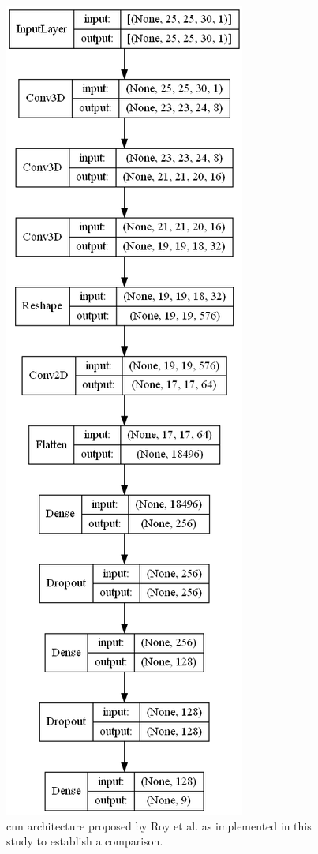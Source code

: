 \begin{figure}[bp]
    \centering
    \includegraphics[width=\linewidth]{figs/vineyard_classification/networks/hybrid_sn_25x24_8.png}
	\caption{\acrshort{cnn} architecture proposed by Roy et al. \cite{roy_hybridsn_2020} as implemented in this study to establish a comparison. }
	\label{fig:hybridsn_cnn}
\end{figure}